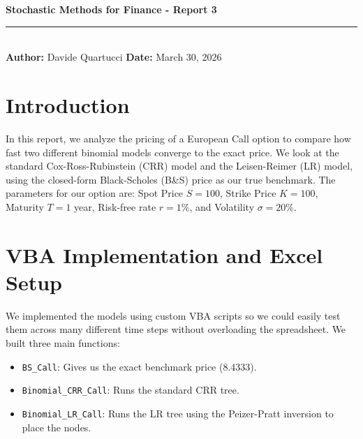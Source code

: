 \documentclass{report}
\begin{document}
\pagestyle{fancy}
\fancyhf{}
\renewcommand{\headrulewidth}{0.4pt}
\setlength{\headheight}{14pt}
\thispagestyle{plain} 

\begin{flushleft}
    {\large \textbf{Stochastic Methods for Finance - Report 3}} \\
    \rule{\textwidth}{0.4pt} \\ 
    \textbf{Author:} Davide Quartucci \hfill \textbf{Date:} March 30, 2026 \\
\end{flushleft}

\begin{center}
\end{center}

\section{Introduction}
In this report, we analyze the pricing of a European Call option to compare how fast two different binomial models converge to the exact price. We look at the standard Cox-Ross-Rubinstein (CRR) model and the Leisen-Reimer (LR) model, using the closed-form Black-Scholes (B\&S) price as our true benchmark. The parameters for our option are: Spot Price $S=100$, Strike Price $K=100$, Maturity $T=1$ year, Risk-free rate $r=1\%$, and Volatility $\sigma=20\%$.

\section{VBA Implementation and Excel Setup}
We implemented the models using custom VBA scripts so we could easily test them across many different time steps without overloading the spreadsheet. We built three main functions:
\begin{itemize}
    \item \texttt{BS\_Call}: Gives us the exact benchmark price (8.4333).
    \item \texttt{Binomial\_CRR\_Call}: Runs the standard CRR tree.
    \item \texttt{Binomial\_LR\_Call}: Runs the LR tree using the Peizer-Pratt inversion to place the nodes.
\end{itemize}
\end{document}
